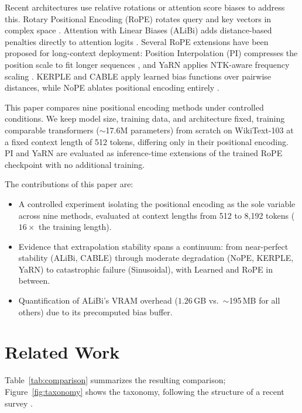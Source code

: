 \documentclass[conference]{IEEEtran}
\begin{document}
Recent architectures use relative rotations or attention score biases to address this. Rotary Positional Encoding (RoPE) rotates query and key vectors in complex space \cite{su2024roformer}. Attention with Linear Biases (ALiBi) adds distance-based penalties directly to attention logits \cite{press2022}. Several RoPE extensions have been proposed for long-context deployment: Position Interpolation (PI) compresses the position scale to fit longer sequences \cite{chen2023}, and YaRN applies NTK-aware frequency scaling \cite{peng2023yarn}. KERPLE and CABLE apply learned bias functions over pairwise distances, while NoPE ablates positional encoding entirely \cite{kazemnejad2023,cable2023}.

This paper compares nine positional encoding methods under controlled conditions. We keep model size, training data, and architecture fixed, training comparable transformers ($\sim$17.6M parameters) from scratch on WikiText-103 at a fixed context length of 512 tokens, differing only in their positional encoding. PI and YaRN are evaluated as inference-time extensions of the trained RoPE checkpoint with no additional training.

The contributions of this paper are:
\begin{itemize}
\item A controlled experiment isolating the positional encoding as the sole variable across nine methods, evaluated at context lengths from 512 to 8,192 tokens ($16\times$ the training length).
\item Evidence that extrapolation stability spans a continuum: from near-perfect stability (ALiBi, CABLE) through moderate degradation (NoPE, KERPLE, YaRN) to catastrophic failure (Sinusoidal), with Learned and RoPE in between.
\item Quantification of ALiBi's VRAM overhead ($1.26$\,GB vs.\ $\sim$195\,MB for all others) due to its precomputed bias buffer.
\end{itemize}

\section{Related Work}
\label{sec:related}

Table~\ref{tab:comparison} summarizes the resulting comparison; Figure~\ref{fig:taxonomy} shows the taxonomy, following the structure of a recent survey \cite{zhao2024survey}.
\end{document}
